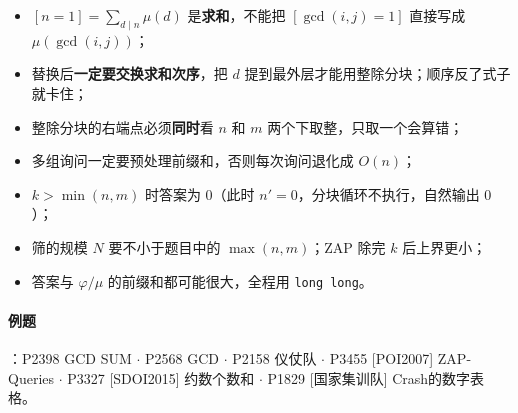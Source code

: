 \begin{itemize}
    \item $[n=1] = \sum_{d\mid n}\mu(d)$ 是\textbf{求和}，不能把 $[\gcd(i,j)=1]$ 直接写成 $\mu(\gcd(i,j))$；
    \item 替换后\textbf{一定要交换求和次序}，把 $d$ 提到最外层才能用整除分块；顺序反了式子就卡住；
    \item 整除分块的右端点必须\textbf{同时}看 $n$ 和 $m$ 两个下取整，只取一个会算错；
    \item 多组询问一定要预处理前缀和，否则每次询问退化成 $O(n)$；
    \item $k > \min(n,m)$ 时答案为 $0$（此时 $n' = 0$，分块循环不执行，自然输出 $0$）；
    \item 筛的规模 $N$ 要不小于题目中的 $\max(n,m)$；ZAP 除完 $k$ 后上界更小；
    \item 答案与 $\varphi/\mu$ 的前缀和都可能很大，全程用 \texttt{long long}。
\end{itemize}

\paragraph{例题}：P2398 GCD SUM $\cdot$ P2568 GCD $\cdot$ P2158 仪仗队 $\cdot$
P3455 [POI2007] ZAP-Queries $\cdot$ P3327 [SDOI2015] 约数个数和 $\cdot$ P1829 [国家集训队] Crash的数字表格。
